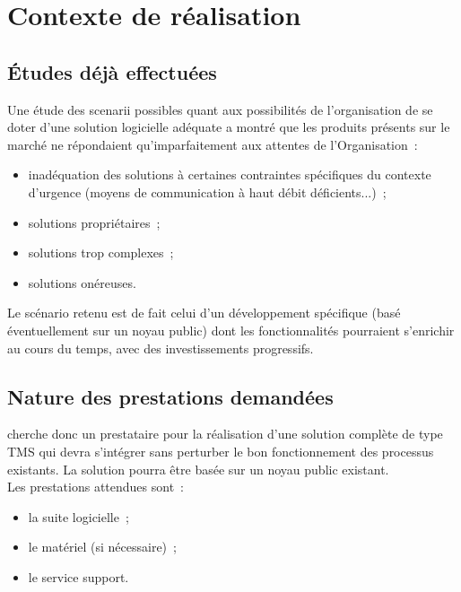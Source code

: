 
\section{Contexte de réalisation}

\subsection{Études déjà effectuées}
Une étude des scenarii possibles quant aux possibilités de l'organisation de se doter d'une solution logicielle adéquate a montré que les produits présents sur le marché ne répondaient qu'imparfaitement aux attentes de l'Organisation~:
\begin{itemize}
	\item inadéquation des solutions à certaines contraintes spécifiques du contexte d'urgence (moyens de communication à haut débit déficients...)~;
	\item solutions propriétaires~;
	\item solutions trop complexes~;
	\item solutions onéreuses.
\end{itemize}
Le scénario retenu est de fait celui d'un développement spécifique (basé éventuellement sur un noyau public) dont les fonctionnalités pourraient s'enrichir au cours du temps, avec des investissements progressifs.

\subsection{Nature des prestations demandées}
\mo cherche donc un prestataire pour la réalisation d'une solution complète de type TMS qui devra s'intégrer sans perturber le bon fonctionnement des processus existants. La solution pourra être basée sur un noyau public existant.
\\
Les prestations attendues sont~:
\begin{itemize}
	\item la suite logicielle~;
	\item le matériel (si nécessaire)~;
	\item le service support.
\end{itemize}

